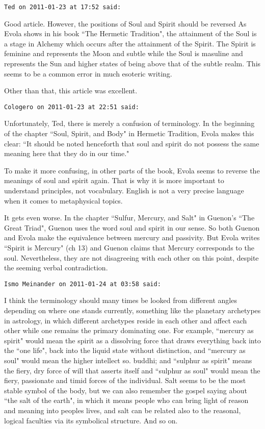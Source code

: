 \begin{footnotesize}\begin{sffamily}



\texttt{Ted on 2011-01-23 at 17:52 said: }

Good article. However, the positions of Soul and Spirit should be reversed As Evola shows in his book ``The Hermetic Tradition", the attainment of the Soul is a stage in Alchemy which occurs after the attainment of the Spirit. The Spirit is feminine and represents the Moon and subtle while the Soul is masuline and represents the Sun and higher states of being above that of the subtle realm. This seems to be a common error in much esoteric writing.

Other than that, this article was excellent.


\hfill

\texttt{Cologero on 2011-01-23 at 22:51 said: }

Unfortunately, Ted, there is merely a confusion of terminology. In the beginning of the chapter ``Soul, Spirit, and Body" in Hermetic Tradition, Evola makes this clear: ``It should be noted henceforth that soul and spirit do not possess the same meaning here that they do in our time."

To make it more confusing, in other parts of the book, Evola seems to reverse the meanings of soul and spirit again. That is why it is more important to understand principles, not vocabulary. English is not a very precise language when it comes to metaphysical topics.

It gets even worse. In the chapter ``Sulfur, Mercury, and Salt" in Guenon's ``The Great Triad", Guenon uses the word soul and spirit in our sense. So both Guenon and Evola make the equivalence between mercury and passivity. But Evola writes ``Spirit is Mercury" (ch 13) and Guenon claims that Mercury corresponds to the soul. Nevertheless, they are not disagreeing with each other on this point, despite the seeming verbal contradiction.


\hfill

\texttt{Ismo Meinander on 2011-01-24 at 03:58 said: }

I think the terminology should many times be looked from different angles depending on where one stands currently, something like the planetary archetypes in astrology, in which different archetypes reside in each other and affect each other while one remains the primary dominating one. For example, ``mercury as spirit" would mean the spirit as a dissolving force that draws everything back into the ``one life", back into the liquid state without distinction, and ``mercury as soul" would mean the higher intellect so. buddhi; and ``sulphur as spirit" means the fiery, dry force of will that asserts itself and ``sulphur as soul" would mean the fiery, passionate and timid forces of the individual. Salt seems to be the most stable symbol of the body, but we can also remember the gospel saying about ``the salt of the earth", in which it means people who can bring light of reason and meaning into peoples lives, and salt can be related also to the reasonal, logical faculties via its symbolical structure. And so on.


\end{sffamily}
\end{footnotesize}
